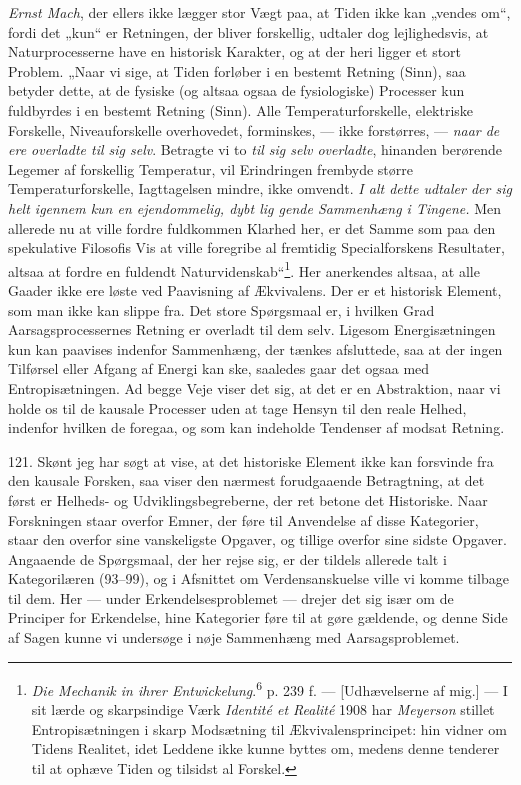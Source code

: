 \documentclass[12pt,a4paper]{book}
\newcommand{\opage}[1]{\marginnote{\footnotesize\textit{[#1]}}}
\begin{document}
\emph{Ernst Mach}, der ellers ikke lægger stor Vægt paa, at Tiden ikke kan „vendes
om“, fordi det „kun“ er Retningen, der bliver forskellig, udtaler dog lejlighedsvis,
at Naturprocesserne have en historisk Karakter, og at der heri ligger et stort
Problem. „Naar vi sige, at Tiden forløber i en bestemt Retning (Sinn), saa betyder
dette, at de fysiske (og altsaa ogsaa de fysiologiske) Processer kun fuldbyrdes i en
bestemt Retning (Sinn). Alle Temperaturforskelle, elektriske Forskelle,
Niveauforskelle overhovedet, forminskes, --- ikke forstørres, --- \emph{naar de ere
overladte til sig selv}. Betragte vi to \emph{til sig selv overladte}, hinanden
berørende Legemer af forskellig Temperatur, vil Erindringen frembyde større
Temperaturforskelle, Iagttagelsen mindre, ikke omvendt. \emph{I alt dette udtaler
der sig helt igennem kun en ejendommelig, dybt lig\opage{287} gende Sammenhæng i Tingene.} Men
allerede nu at ville fordre fuldkommen Klarhed her, er det Samme som paa den
spekulative Filosofis Vis at ville foregribe al fremtidig Specialforskens
Resultater, altsaa at fordre en fuldendt Naturvidenskab“\footnote{\emph{Die Mechanik
in ihrer Entwickelung}.\textsuperscript{6} p. 239 f. --- [Udhævelserne af mig.] --- I
sit lærde og skarpsindige Værk \emph{Identité et Realité} 1908 har \emph{Meyerson}
stillet Entropisætningen i skarp Modsætning til Ækvivalensprincipet: hin vidner om
Tidens Realitet, idet Leddene ikke kunne byttes om, medens denne tenderer til at
ophæve Tiden og tilsidst al Forskel.}. Her anerkendes altsaa, at alle Gaader ikke
ere løste ved Paavisning af Ækvivalens. Der er et historisk Element, som man ikke
kan slippe fra. Det store Spørgsmaal er, i hvilken Grad Aarsagsprocessernes Retning er overladt til dem selv. Ligesom Energisætningen kun kan paavises indenfor
Sammenhæng, der tænkes afsluttede, saa at der ingen Tilførsel eller Afgang af Energi
kan ske, saaledes gaar det ogsaa med Entropisætningen. Ad begge Veje viser det sig,
at det er en Abstraktion, naar vi holde os til de kausale Processer uden at tage
Hensyn til den reale Helhed, indenfor hvilken de foregaa, og som kan indeholde
Tendenser af modsat Retning.

121. Skønt jeg har søgt at vise, at det historiske Element ikke kan forsvinde fra
den kausale Forsken, saa viser den nærmest forudgaaende Betragtning, at det først er
Helheds- og Udviklingsbegreberne, der ret betone det Historiske. Naar Forskningen
staar overfor Emner, der føre til Anvendelse af disse Kategorier, staar den overfor
sine vanskeligste Opgaver, og tillige overfor sine sidste Opgaver. Angaaende de
Spørgsmaal, der her rejse sig, er der tildels allerede talt i Kategorilæren
(93--99), og i Afsnittet om Verdensanskuelse ville vi komme tilbage til dem. Her ---
under Erkendelsesproblemet --- drejer det sig især om de Principer for Erkendelse,
hine Kategorier føre til at gøre gældende, og denne Side af Sagen kunne vi undersøge
i nøje Sammenhæng med Aarsagsproblemet.
\end{document}
